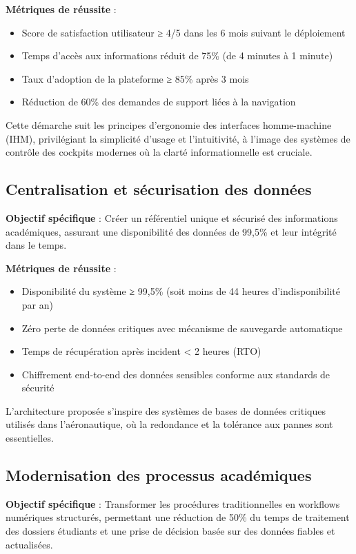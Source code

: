 \documentclass[12pt,a4paper]{report}
\begin{document}
\textbf{Métriques de réussite} :
\begin{itemize}
    \item Score de satisfaction utilisateur ≥ 4/5 dans les 6 mois suivant le déploiement
    \item Temps d'accès aux informations réduit de 75\% (de 4 minutes à 1 minute)
    \item Taux d'adoption de la plateforme ≥ 85\% après 3 mois
    \item Réduction de 60\% des demandes de support liées à la navigation
\end{itemize}

Cette démarche suit les principes d'ergonomie des interfaces homme-machine (IHM), privilégiant la simplicité d'usage et l'intuitivité, à l'image des systèmes de contrôle des cockpits modernes où la clarté informationnelle est cruciale.

\subsection{Centralisation et sécurisation des données}

\textbf{Objectif spécifique} : Créer un référentiel unique et sécurisé des informations académiques, assurant une disponibilité des données de 99,5\% et leur intégrité dans le temps.

\textbf{Métriques de réussite} :
\begin{itemize}
    \item Disponibilité du système ≥ 99,5\% (soit moins de 44 heures d'indisponibilité par an)
    \item Zéro perte de données critiques avec mécanisme de sauvegarde automatique
    \item Temps de récupération après incident < 2 heures (RTO)
    \item Chiffrement end-to-end des données sensibles conforme aux standards de sécurité
\end{itemize}

L'architecture proposée s'inspire des systèmes de bases de données critiques utilisés dans l'aéronautique, où la redondance et la tolérance aux pannes sont essentielles.

\subsection{Modernisation des processus académiques}

\textbf{Objectif spécifique} : Transformer les procédures traditionnelles en workflows numériques structurés, permettant une réduction de 50\% du temps de traitement des dossiers étudiants et une prise de décision basée sur des données fiables et actualisées.
\end{document}
